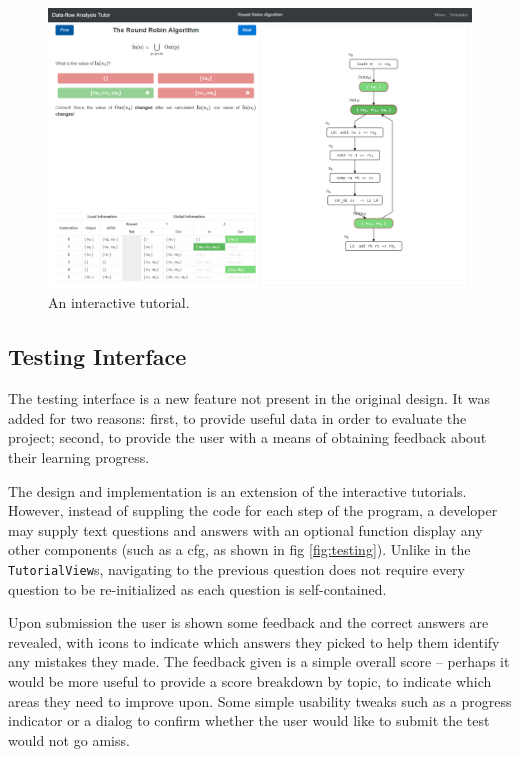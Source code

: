 \documentclass[bsc,twoside,singlespacing,parskip,logo,notimes,normalheadings]{infthesis}
\begin{document}
        \begin{figure}[p]
          \centering
          \includegraphics[width=\textheight, angle=-90]{img/lesson.png}
          \captionsetup{width=\textwidth, justification=centering}
          \caption{An interactive tutorial.}\label{fig:tutorial}
        \end{figure}

        \subsection{Testing Interface}

        The testing interface is a new feature not present in the
        original design. It was added for two reasons: first, to
        provide useful data in order to evaluate the project; second,
        to provide the user with a means of obtaining feedback about
        their learning progress.

        The design and implementation is an extension of the
        interactive tutorials. However, instead of suppling the code
        for each step of the program, a developer may supply text
        questions and answers with an optional function display any
        other components (such as a \gls{cfg}, as shown in fig
        \ref{fig:testing}). Unlike in the {\tt TutorialView}s,
        navigating to the previous question does not require every
        question to be re-initialized as each question is
        self-contained.

        Upon submission the user is shown some feedback and the
        correct answers are revealed, with icons to indicate which
        answers they picked to help them identify any mistakes they
        made. The feedback given is a simple overall score -- perhaps
        it would be more useful to provide a score breakdown by topic,
        to indicate which areas they need to improve upon. Some simple
        usability tweaks such as a progress indicator or a dialog to
        confirm whether the user would like to submit the test would
        not go amiss.
\end{document}
